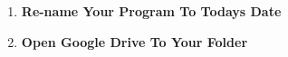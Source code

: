 \documentclass{article}
\begin{document}
\begin{enumerate}
\item {\large \textbf{Re-name Your Program To Todays Date}}


\item {\large \textbf{Open Google Drive To Your Folder}}


\end{enumerate}
\end{document}
